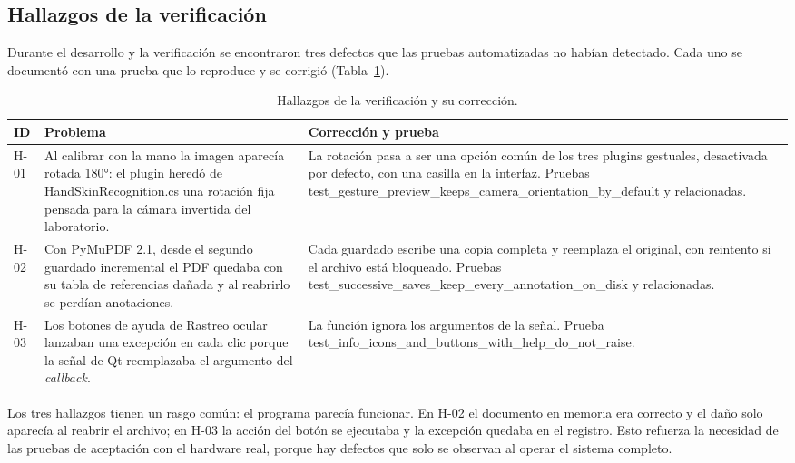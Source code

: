 \subsection{Hallazgos de la verificación}
\label{sec:hallazgos}

Durante el desarrollo y la verificación se encontraron tres defectos que las pruebas automatizadas no habían detectado. Cada uno se documentó con una prueba que lo reproduce y se corrigió (Tabla~\ref{tab:hallazgos_verif}).

\begin{table}[H]
\centering
\caption{Hallazgos de la verificación y su corrección.}
\label{tab:hallazgos_verif}
\footnotesize
\begin{tabularx}{\textwidth}{>{\raggedright\arraybackslash}p{1.1cm} >{\raggedright\arraybackslash}X >{\raggedright\arraybackslash}X}
\toprule
ID & Problema & Corrección y prueba \\ \midrule
H-01 & Al calibrar con la mano la imagen aparecía rotada 180°: el plugin heredó de HandSkinRecognition.cs una rotación fija pensada para la cámara invertida del laboratorio. & La rotación pasa a ser una opción común de los tres plugins gestuales, desactivada por defecto, con una casilla en la interfaz. Pruebas test\_gesture\_preview\_keeps\_camera\_orientation\_by\_default y relacionadas. \\ \midrule
H-02 & Con PyMuPDF 2.1, desde el segundo guardado incremental el PDF quedaba con su tabla de referencias dañada y al reabrirlo se perdían anotaciones. & Cada guardado escribe una copia completa y reemplaza el original, con reintento si el archivo está bloqueado. Pruebas test\_successive\_saves\_keep\_every\_annotation\_on\_disk y relacionadas. \\ \midrule
H-03 & Los botones de ayuda de Rastreo ocular lanzaban una excepción en cada clic porque la señal de Qt reemplazaba el argumento del \textit{callback}. & La función ignora los argumentos de la señal. Prueba test\_info\_icons\_and\_buttons\_with\_help\_do\_not\_raise. \\ \bottomrule
\end{tabularx}
\end{table}

Los tres hallazgos tienen un rasgo común: el programa parecía funcionar. En H-02 el documento en memoria era correcto y el daño solo aparecía al reabrir el archivo; en H-03 la acción del botón se ejecutaba y la excepción quedaba en el registro. Esto refuerza la necesidad de las pruebas de aceptación con el hardware real, porque hay defectos que solo se observan al operar el sistema completo.

